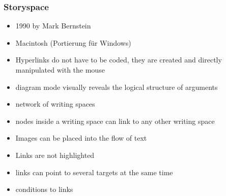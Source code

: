\begin{frame}
\frametitle{Storyspace}
\begin{itemize}
	\item 1990 by Mark Bernstein
	\item Macintosh (Portierung für Windows)
	\item Hyperlinks do not have to be coded, they are created and directly manipulated with the mouse
	\item diagram mode visually reveals the logical structure of arguments
	\item network of writing spaces
	\item nodes inside a writing space can link to any other writing space
	\item Images can be placed into the flow of text
	\item Links are not highlighted
	\item links can point to several targets at the same time
	\item conditions to links
\end{itemize}

\end{frame}